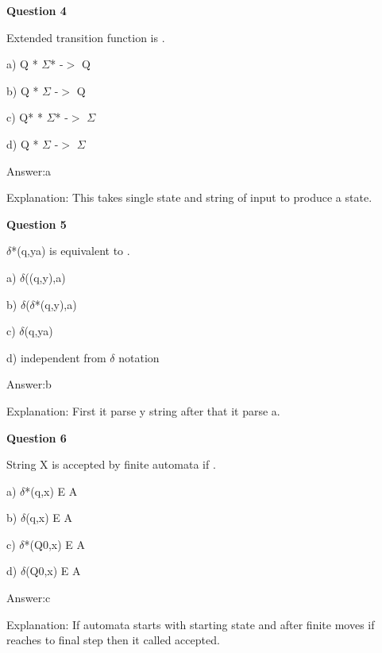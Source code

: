 \documentclass{article}
\begin{document}
\begin{mdframed}[linewidth=1pt, roundcorner=5pt, linecolor=gray!30, backgroundcolor=gray!5]
\textbf{Question 4} 

Extended transition function is .

a) Q * $\Sigma$* -$>$ Q

b) Q * $\Sigma$ -$>$ Q

c) Q* * $\Sigma$* -$>$ $\Sigma$

d) Q * $\Sigma$ -$>$ $\Sigma$
\vspace{5pt} \par
\begin{tcolorbox}[colback=green!5, colframe=green!40!black, title=Solution]
Answer:a

Explanation: This takes single state and string of input to produce a state.
\end{tcolorbox}
\end{mdframed}

\begin{mdframed}[linewidth=1pt, roundcorner=5pt, linecolor=gray!30, backgroundcolor=gray!5]
\textbf{Question 5} 

$\delta$*(q,ya) is equivalent to .

a) $\delta$((q,y),a)

b) $\delta$($\delta$*(q,y),a)

c) $\delta$(q,ya)

d) independent from $\delta$ notation
\vspace{5pt} \par
\begin{tcolorbox}[colback=green!5, colframe=green!40!black, title=Solution]
Answer:b

Explanation: First it parse y string after that it parse a.
\end{tcolorbox}
\end{mdframed}

\begin{mdframed}[linewidth=1pt, roundcorner=5pt, linecolor=gray!30, backgroundcolor=gray!5]
\textbf{Question 6} 

String X is accepted by finite automata if .

a) $\delta$*(q,x) E A

b) $\delta$(q,x) E A

c) $\delta$*(Q0,x) E A

d) $\delta$(Q0,x) E A
\vspace{5pt} \par
\begin{tcolorbox}[colback=green!5, colframe=green!40!black, title=Solution]
Answer:c

Explanation: If automata starts with starting state and after finite moves if reaches to final step then it called accepted.
\end{tcolorbox}
\end{mdframed}
\newpage
\end{document}
